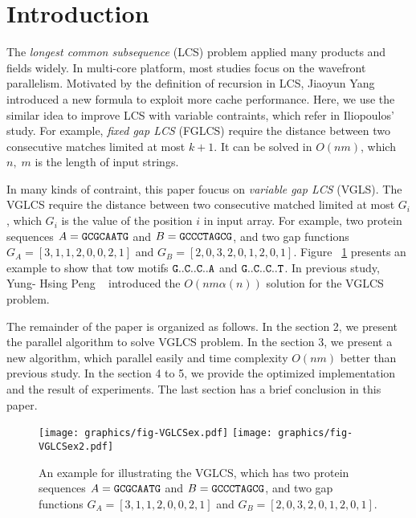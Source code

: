 \section{Introduction} %
\label{sec:Introduction}

The \emph{longest common subsequence} (LCS) problem applied many
products and fields widely.  In multi-core platform, most studies
focus on the wavefront parallelism. Motivated by the definition of
recursion in LCS, Jiaoyun Yang introduced a new formula to exploit
more cache performance.  Here, we use the similar idea to improve LCS
with variable contraints, which refer in Iliopoulos' study.  For
example, \emph{fixed gap LCS} (FGLCS) require the distance between two
consecutive matches limited at most $k+1$.  It can be solved in
$O(nm)$, which $n, \; m$ is the length of input strings.

In many kinds of contraint, this paper foucus on \emph{variable gap
LCS} (VGLS). The VGLCS require the distance between two consecutive
matched limited at most $G_i$, which $G_i$ is the value of the
position $i$ in input array. For example, two protein sequences $A =
\tt{GCGCAATG}$ and $B = \tt{GCCCTAGCG}$, and two gap functions $G_A =
[3, 1, 1, 2, 0, 0, 2, 1]$ and $G_B = [2, 0, 3, 2, 0, 1, 2, 0, 1]$.
Figure ~\ref{fig:VGLCSex} presents an example to show that tow motifs
$\tt{G..C..C..A}$ and $\tt{G..C..C..T}$.  In previous study, Yung-
Hsing Peng ~\cite{yunghsing} introduced the $O(nm \alpha(n))$ solution
for the VGLCS problem.

The remainder of the paper is organized as follows. In the section 2,
we present the parallel algorithm to solve VGLCS problem. In the
section 3, we present a new algorithm, which parallel easily and time
complexity $O(nm)$ better than previous study. In the section 4 to 5,
we provide the optimized implementation and the result of experiments.
The last section has a brief conclusion in this paper.

\begin{figure}[!thb]
  \centering
  \texttt{[image: graphics/fig-VGLCSex.pdf]}
  \texttt{[image: graphics/fig-VGLCSex2.pdf]}
  \caption{An example for illustrating the VGLCS, which has two protein sequences $A = \tt{GCGCAATG}$ and $B = \tt{GCCCTAGCG}$, and two gap functions $G_A = [3, 1, 1, 2, 0, 0, 2, 1]$ and $G_B = [2, 0, 3, 2, 0, 1, 2, 0, 1]$.}
  \label{fig:VGLCSex}
\end{figure}